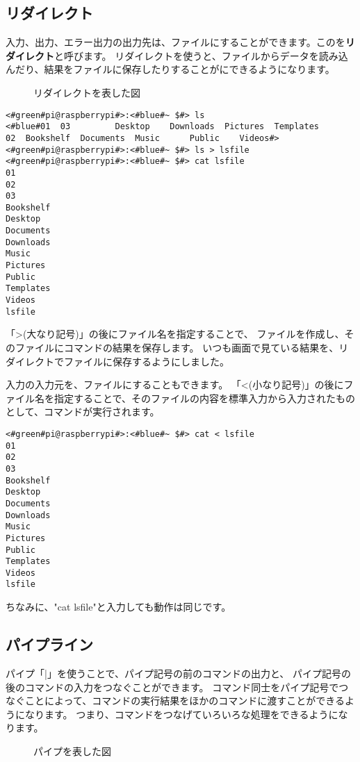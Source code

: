 \subsection{リダイレクト}
入力、出力、エラー出力の出力先は、ファイルにすることができます。このを{\bf リダイレクト}と呼びます。
リダイレクトを使うと、ファイルからデータを読み込んだり、結果をファイルに保存したりすることがにできるようになります。
\begin{figure}
    \centering
    
    \caption{リダイレクトを表した図}
    \label{ch03:redirect}
\end{figure}
\begin{lstlisting}[caption=lsの出力をリダイレクトする, label=redirectLs]
<#green#pi@raspberrypi#>:<#blue#~ $#> ls 
<#blue#01  03         Desktop    Downloads  Pictures  Templates
02  Bookshelf  Documents  Music      Public    Videos#>
<#green#pi@raspberrypi#>:<#blue#~ $#> ls > lsfile
<#green#pi@raspberrypi#>:<#blue#~ $#> cat lsfile
01
02
03
Bookshelf
Desktop
Documents
Downloads
Music
Pictures
Public
Templates
Videos
lsfile
\end{lstlisting}

「>(大なり記号)」の後にファイル名を指定することで、
ファイルを作成し、そのファイルにコマンドの結果を保存します。
いつも画面で見ている結果を、リダイレクトでファイルに保存するようにしました。

入力の入力元を、ファイルにすることもできます。
「<(小なり記号)」の後にファイル名を指定することで、そのファイルの内容を標準入力から入力されたものとして、コマンドが実行されます。
\begin{lstlisting}[caption=catコマンドにリダイレクトでファイルを入力する, label=redirectCat]
<#green#pi@raspberrypi#>:<#blue#~ $#> cat < lsfile
01
02
03
Bookshelf
Desktop
Documents
Downloads
Music
Pictures
Public
Templates
Videos
lsfile
\end{lstlisting}

ちなみに、"cat lsfile"と入力しても動作は同じです。

\subsection{パイプライン}\label{sec:pipelne}

パイプ「|」を使うことで、パイプ記号の前のコマンドの出力と、
パイプ記号の後のコマンドの入力をつなぐことができます。
コマンド同士をパイプ記号でつなぐことによって、コマンドの実行結果をほかのコマンドに渡すことができるようになります。
つまり、コマンドをつなげていろいろな処理をできるようになります。
\begin{figure}[h]
    \centering
    
    \caption{パイプを表した図}
    \label{ch03:pipe}
\end{figure}

